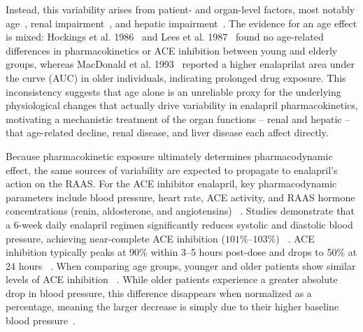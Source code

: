 \documentclass[pharmaceutics,article,submit,pdftex,moreauthors]{Definitions/mdpi}
\begin{document}
Instead, this variability arises from patient- and organ-level factors, most notably age~\cite{Hockings1986, Lees1987a, MacDonald1993}, renal impairment~\cite{Fruncillo1987, Kelly1986, Lowenthal1984}, and hepatic impairment~\cite{Baba1990, Ohnishi1989}. The evidence for an age effect is mixed: Hockings et al. 1986~\cite{Hockings1986} and Lees et al. 1987~\cite{Lees1987a} found no age-related differences in pharmacokinetics or ACE inhibition between young and elderly groups, whereas MacDonald et al. 1993~\cite{MacDonald1993} reported a higher enalaprilat area under the curve (AUC) in older individuals, indicating prolonged drug exposure. This inconsistency suggests that age alone is an unreliable proxy for the underlying physiological changes that actually drive variability in enalapril pharmacokinetics, motivating a mechanistic treatment of the organ functions -- renal and hepatic -- that age-related decline, renal disease, and liver disease each affect directly.

Because pharmacokinetic exposure ultimately determines pharmacodynamic effect, the same sources of variability are expected to propagate to enalapril's action on the RAAS. For the ACE inhibitor enalapril, key pharmacodynamic parameters include blood pressure, heart rate, ACE activity, and RAAS hormone concentrations (renin, aldosterone, and angiotensins) ~\cite{Donnelly1987, Lees1987a, Ribeiro1996, Shionoiri1985}. Studies demonstrate that a 6-week daily enalapril regimen significantly reduces systolic and diastolic blood pressure, achieving near-complete ACE inhibition (\(101\%\)--\(103\%\)) ~\cite{Donnelly1990}. ACE inhibition typically peaks at 90\% within 3--5 hours post-dose and drops to 50\% at 24 hours ~\cite{Ribeiro1996}. When comparing age groups, younger and older patients show similar levels of ACE inhibition ~\cite{Lees1987a}. While older patients experience a greater absolute drop in blood pressure, this difference disappears when normalized as a percentage, meaning the larger decrease is simply due to their higher baseline blood pressure~\cite{Lees1987a}.
\end{document}
